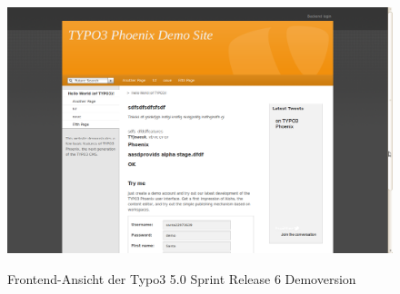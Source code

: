 \begin{figure}[!h]
\begin{center}
\label{fig.typo3frontend}
\includegraphics[scale=0.35]{images/typo3/frontend.png}
\caption{Frontend-Ansicht der Typo3 5.0 Sprint Release 6 Demoversion}
\end{center}
\end{figure}


